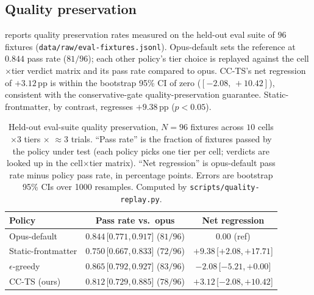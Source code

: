 \subsection{Quality preservation}

 reports quality preservation rates measured on
the held-out eval suite of $96$ fixtures (\texttt{data/raw/eval-fixtures.jsonl}).
Opus-default sets the reference at $0.844$ pass rate ($81/96$); each
other policy's tier choice is replayed against the cell\(\times\)tier
verdict matrix and its pass rate compared to opus. CC-TS's net
regression of $+3.12\,\mathrm{pp}$ is within the bootstrap 95\% CI
of zero ($[-2.08,\,+10.42]$), consistent with the conservative-gate
quality-preservation guarantee. Static-frontmatter, by contrast,
regresses $+9.38\,\mathrm{pp}$ ($p<0.05$).

\begin{table}[h]
\centering
\caption{Held-out eval-suite quality preservation, $N=96$
fixtures across $10$ cells \(\times 3\) tiers \(\times\)
\(\approx 3\) trials. ``Pass rate'' is the fraction of fixtures
passed by the policy under test (each policy picks one tier per cell;
verdicts are looked up in the cell\(\times\)tier matrix).
``Net regression'' is opus-default pass rate minus policy pass rate,
in percentage points. Errors are bootstrap 95\% CIs over 1000
resamples. Computed by \texttt{scripts/quality-replay.py}.}
\label{tab:quality-table}
\begin{tabular}{lcc}
\toprule
\textbf{Policy} & \textbf{Pass rate vs.\ opus} & \textbf{Net regression} \\
\midrule
Opus-default        & $0.844$\,[$0.771$,\,$0.917$] ($81/96$) & $0.00$ (ref)                  \\
Static-frontmatter  & $0.750$\,[$0.667$,\,$0.833$] ($72/96$) & $+9.38$\,[$+2.08$,\,$+17.71$] \\
$\epsilon$-greedy   & $0.865$\,[$0.792$,\,$0.927$] ($83/96$) & $-2.08$\,[$-5.21$,\,$+0.00$]  \\
CC-TS (ours)        & $0.812$\,[$0.729$,\,$0.885$] ($78/96$) & $+3.12$\,[$-2.08$,\,$+10.42$] \\
\bottomrule
\end{tabular}
\end{table}

